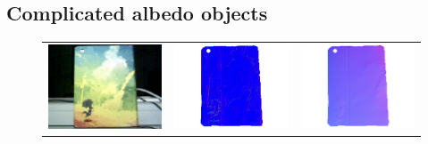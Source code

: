 \subsection{Complicated albedo objects}

\begin{figure}[!ht]
\centering
\setlength{\tabcolsep}{0.1em} %
 {\renewcommand{\arraystretch}{1.6}%
\begin{tabular}{c|c c}
   \includegraphics[height = 0.24\linewidth]{figures/result/robust_padback_rgb.pdf} 
   &
   \includegraphics[height = 0.24\linewidth]{figures/result/rgbd_padback_normal.pdf} &
   \includegraphics[height = 0.24\linewidth]{figures/result/robust_padback_normal.pdf} \\


\end{tabular}}
\end{figure}
